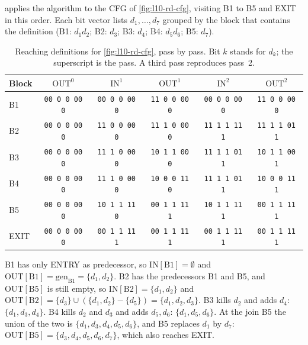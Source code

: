 \documentclass[../main.tex]{subfiles}
\begin{document}
 applies the algorithm to the CFG of
\cref{fig:l10-rd-cfg}, visiting B1 to B5 and EXIT in this order.  Each
bit vector lists $d_1,\dots,d_7$ grouped by the block that contains the
definition (B1: $d_1d_2$; B2: $d_3$; B3: $d_4$; B4: $d_5d_6$; B5:
$d_7$).

\begin{table}[tb]
  \centering
  \small
  \setlength{\tabcolsep}{4pt}
  \caption{Reaching definitions for \cref{fig:l10-rd-cfg}, pass by
    pass.  Bit $k$ stands for $d_k$; the superscript is the pass.  A
    third pass reproduces pass~2.}
  \label{tab:l10-rd-trace}
  \begin{tabular}{@{}l*{5}{c}@{}}
    \toprule
    Block & $\mathrm{OUT}^0$ & $\mathrm{IN}^1$ & $\mathrm{OUT}^1$
      & $\mathrm{IN}^2$ & $\mathrm{OUT}^2$ \\
    \midrule
    B1 & \texttt{00 0 0 00 0} & \texttt{00 0 0 00 0} & \texttt{11 0 0 00 0}
       & \texttt{00 0 0 00 0} & \texttt{11 0 0 00 0} \\
    B2 & \texttt{00 0 0 00 0} & \texttt{11 0 0 00 0} & \texttt{11 1 0 00 0}
       & \texttt{11 1 1 11 1} & \texttt{11 1 1 01 1} \\
    B3 & \texttt{00 0 0 00 0} & \texttt{11 1 0 00 0} & \texttt{10 1 1 00 0}
       & \texttt{11 1 1 01 1} & \texttt{10 1 1 00 1} \\
    B4 & \texttt{00 0 0 00 0} & \texttt{11 1 0 00 0} & \texttt{10 0 0 11 0}
       & \texttt{11 1 1 01 1} & \texttt{10 0 0 11 1} \\
    B5 & \texttt{00 0 0 00 0} & \texttt{10 1 1 11 0} & \texttt{00 1 1 11 1}
       & \texttt{10 1 1 11 1} & \texttt{00 1 1 11 1} \\
    EXIT & \texttt{00 0 0 00 0} & \texttt{00 1 1 11 1} & \texttt{00 1 1 11 1}
       & \texttt{00 1 1 11 1} & \texttt{00 1 1 11 1} \\
    \bottomrule
  \end{tabular}
\end{table}

\begin{example}
  \label{ex:l10-pass1}
  B1 has only ENTRY as predecessor, so $\mathrm{IN}[\mathrm{B1}]=\emptyset$
  and $\mathrm{OUT}[\mathrm{B1}]=\mathrm{gen}_{\mathrm{B1}}=\{d_1,d_2\}$.
  B2 has the predecessors B1 and B5, and $\mathrm{OUT}[\mathrm{B5}]$ is
  still empty, so $\mathrm{IN}[\mathrm{B2}]=\{d_1,d_2\}$ and
  $\mathrm{OUT}[\mathrm{B2}]=\{d_3\}\cup(\{d_1,d_2\}-\{d_5\})=\{d_1,d_2,d_3\}$.
  B3 kills $d_2$ and adds $d_4$: $\{d_1,d_3,d_4\}$.  B4 kills $d_2$ and
  $d_3$ and adds $d_5,d_6$: $\{d_1,d_5,d_6\}$.  At the join B5 the union
  of the two is $\{d_1,d_3,d_4,d_5,d_6\}$, and B5 replaces $d_1$ by
  $d_7$: $\mathrm{OUT}[\mathrm{B5}]=\{d_3,d_4,d_5,d_6,d_7\}$, which also
  reaches EXIT.
\end{example}
\end{document}
